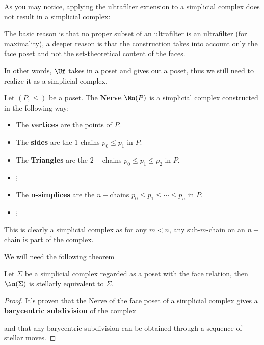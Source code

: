 As you may notice, applying the ultrafilter extension to a simplicial complex does not result in a simplicial complex:

The basic reason is that no proper subset of an ultrafilter is an ultrafilter (for maximality), a deeper reason is that the construction 
takes into account only the face poset and not the set-theoretical content of the faces.

In other words, $\Uf$ takes in a poset and gives out a poset, thus we still need to realize it as a simplicial complex.

\begin{definition}\hfill 

    Let $(P,\leq)$ be a poset. The \textbf{Nerve} $\Nn(P)$ is a simplicial complex constructed in the following way:
    \begin{itemize}
        \item  The \textbf{vertices} are the points of $P$.
        \item  The \textbf{sides} are the $1$-chains $p_0\leq p_1$ in $P$.
        \item  The \textbf{Triangles} are the $2-$chains $p_0\leq p_1\leq p_2$ in $P$.
        \item  $\vdots $
        \item The \textbf{n-simplices} are the $n-$chains $p_0\leq p_1\leq\cdots\leq p_n$ in $P$.
        \item $\vdots$
    \end{itemize}

    This is clearly a simplicial complex as for any $m<n$, any sub-$m$-chain on an $n-$chain is part of the complex.
\end{definition}

We will need the following theorem
\begin{theorem}\hfill 

    Let $\Sigma$ be a simplicial complex regarded as a poset with the face relation, then $\Nn(\Sigma)$ is stellarly equivalent to $\Sigma$.    
\end{theorem}
\begin{proof}\hfill 

    It's proven that the Nerve of the face poset of a simplicial complex gives a \textbf{barycentric subdivision} of the complex %

    and that any barycentric subdivision can be obtained through a sequence of stellar moves.%
\end{proof}

